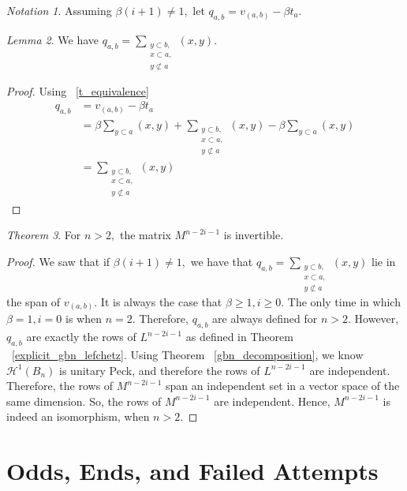 \documentclass[10 pt]{amsart}
\theoremstyle{plain}
\theoremstyle{definition}
\theoremstyle{remark}
\numberwithin{equation}{section}
\newtheorem{thm}{Theorem}[section]
\newtheorem{lem}[thm]{Lemma}
\theoremstyle{remark}
\newtheorem{note}[thm]{Notation}
\newcommand\fbn{\mathcal H}
\begin{document}
\begin{note}
Assuming $\beta(i+1) \neq 1,$ let $q_{a,b} = v_{(a, b)} - \beta t_a.$
\end{note}

\begin{lem}
We have $q_{a,b} = \sum_{\substack{{y\subset b,}\\{x \subset a,}\\{y\not\subset a}}}^{}(x, y).$
\end{lem}
\begin{proof}
Using ~\ref{t_equivalence}
\begin{align*}
	q_{a,b} &= v_{(a, b)} - \beta t_a \\
	&= \beta \sum_{y \subset a}^{}(x, y) + \sum_{\substack{{y\subset b,}\\{x \subset a,}\\{y\not\subset a}}}^{}(x, y) - \beta\sum_{y\subset a}^{}(x, y)\\
	&= \sum_{\substack{{y\subset b,}\\{x \subset a,}\\{y\not\subset a}}}^{}(x, y)
\end{align*}
\end{proof}

\begin{thm}
For $n >2,$ the matrix $M^{n-2i-1}$ is invertible.
\end{thm}
\begin{proof}
We saw that if $\beta(i+1) \neq 1,$ we have that $q_{a,b} = \sum_{\substack{{y\subset b,}\\{x \subset a,}\\{y\not\subset a}}}^{}(x, y)$ lie in the span of $v_{(a, b)}.$ It is always the case that $\beta \geq 1,i \geq 0.$ The only time in which $\beta = 1,i=0$ is when $n = 2.$ Therefore, $q_{a,b}$ are always defined for $n > 2.$ However, $q_{a,b}$ are exactly the rows of $L^{n-2i-1}$ as defined in Theorem ~\ref{explicit_gbn_lefchetz}. Using Theorem ~\ref{gbn_decomposition}, we know $\fbn^1(B_n)$ is unitary Peck, and therefore the rows of $L^{n-2i-1}$ are independent. Therefore, the rows of $M^{n-2i-1}$ span an independent set in a vector space of the same dimension. So, the rows of $M^{n-2i-1}$ are independent. Hence, $M^{n-2i-1}$ is indeed an isomorphism, when $n > 2.$
\end{proof}

\section{Odds, Ends, and Failed Attempts}
\end{document}
